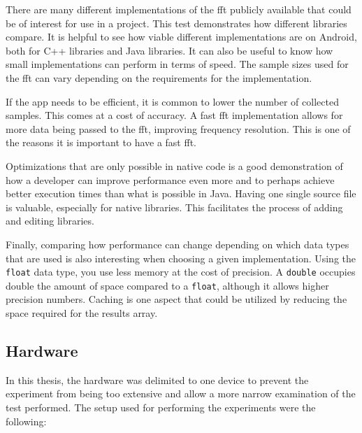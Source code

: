 There are many different implementations of the \gls{fft} publicly available that could be of interest for use in a project. This test demonstrates how different libraries compare. It is helpful to see how viable different implementations are on Android, both for C++ libraries and Java libraries. It can also be useful to know how small implementations can perform in terms of speed. The sample sizes used for the \gls{fft} can vary depending on the requirements for the implementation.

If the app needs to be efficient, it is common to lower the number of collected samples. This comes at a cost of accuracy. A fast \gls{fft} implementation allows for more data being passed to the \gls{fft}, improving frequency resolution. This is one of the reasons it is important to have a fast \gls{fft}.


Optimizations that are only possible in native code is a good demonstration of how a developer can improve performance even more and to perhaps achieve better execution times than what is possible in Java. Having one single source file is valuable, especially for native libraries. This facilitates the process of adding and editing libraries.

Finally, comparing how performance can change depending on which data types that are used is also interesting when choosing a given implementation. Using the \texttt{float} data type, you use less memory at the cost of precision. A \texttt{double} occupies double the amount of space compared to a \texttt{float}, although it allows higher precision numbers. Caching is one aspect that could be utilized by reducing the space required for the results array.

\subsection{Hardware}
In this thesis, the hardware was delimited to one device to prevent the experiment from being too extensive and allow a more narrow examination of the test performed. The setup used for performing the experiments were the following:

